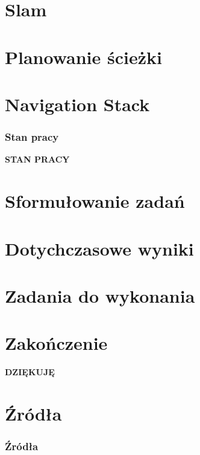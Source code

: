 \documentclass[aspectratio=169,11pt]{beamer}
\let\oldheadcommand\headcommand
\newcommand{\resumenavigation}{\addtocontents{nav}{\string\let\string\headcommand\string\oldheadcommand}}
\begin{document}
\section{Slam}


\section{Planowanie ścieżki}


\section{Navigation Stack}


{
\begin{frame}
\frametitle{Stan pracy}
	\begin{center}
		\LARGE{\textbf{STAN PRACY}}
	\end{center}
\end{frame}
}

\section{Sformułowanie zadań}


\section{Dotychczasowe wyniki}


\section{Zadania do wykonania}


\section{Zakończenie}
\begin{frame}
	\begin{center}
	\LARGE{\textbf{DZIĘKUJĘ}}
	\end{center}
\end{frame}


\section{Źródła}
\begin{frame}[allowframebreaks]
\frametitle{Źródła}
\tiny{
\printbibliography
}
\end{frame}

\end{document}
